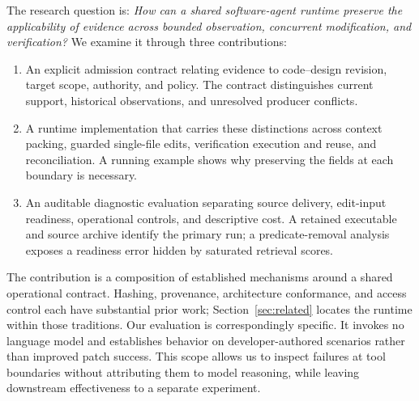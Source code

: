 The research question is: \emph{How can a shared software-agent runtime preserve the applicability of evidence across bounded observation, concurrent modification, and verification?} We examine it through three contributions:
\begin{enumerate}
\item An explicit admission contract relating evidence to code--design revision, target scope, authority, and policy. The contract distinguishes current support, historical observations, and unresolved producer conflicts.
\item A runtime implementation that carries these distinctions across context packing, guarded single-file edits, verification execution and reuse, and reconciliation. A running example shows why preserving the fields at each boundary is necessary.
\item An auditable diagnostic evaluation separating source delivery, edit-input readiness, operational controls, and descriptive cost. A retained executable and source archive identify the primary run; a predicate-removal analysis exposes a readiness error hidden by saturated retrieval scores.
\end{enumerate}

The contribution is a composition of established mechanisms around a shared operational contract. Hashing, provenance, architecture conformance, and access control each have substantial prior work; Section~\ref{sec:related} locates the runtime within those traditions. Our evaluation is correspondingly specific. It invokes no language model and establishes behavior on developer-authored scenarios rather than improved patch success. This scope allows us to inspect failures at tool boundaries without attributing them to model reasoning, while leaving downstream effectiveness to a separate experiment.
